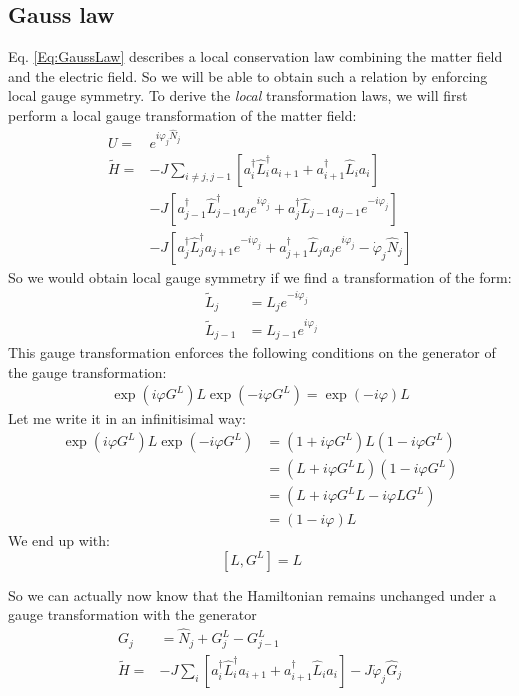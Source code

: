 \documentclass[10pt]{article}
\begin{document}
\subsection{Gauss law}\label{Sec:GaussLaw}
 Eq. \eqref{Eq:GaussLaw} describes a local conservation law combining the matter field and the electric field. So we will be able to obtain such a relation by enforcing local gauge symmetry. To derive the \textit{local} transformation laws, we will first perform a local gauge transformation of the matter field:
 \begin{eqnarray}
U =& e^{i\varphi_j \hat{N}_j}\\
\tilde{H} =&-J\sum_{i\neq j, j-1}\left[a_i^\dag \hat{L}^\dag_i a_{i+1} +a_{i+1}^\dag \hat{L}_i a_i\right]\\
  &- J \left[a_{j-1}^\dag \hat{L}^\dag_{j-1} a_{j} e^{i\varphi_j} +a_{j}^\dag \hat{L}_{j-1}a_{j-1} e^{-i \varphi_j}\right]  \nonumber\\
  &- J \left[a_{j}^\dag \hat{L}^\dag_{j} a_{j+1} e^{-i\varphi_j} +a_{j+1}^\dag \hat{L}_{j}a_{j} e^{i \varphi_j} - \dot{\varphi}_{j}\hat{N}_j\right]  \nonumber
\end{eqnarray}
 So we would obtain local gauge symmetry if we find a transformation of the form:
 \begin{eqnarray}
 ~\tilde{L}_j &= L_j e^{-i\varphi_j}\\
 ~\tilde{L}_{j-1} &= L_{j-1} e^{i\varphi_j}
 \end{eqnarray}
 This gauge transformation enforces the following conditions on the generator of the gauge transformation:
 \begin{align}
\exp(i\varphi G^L)L \exp(-i\varphi G^L) = \exp(-i\varphi)L
\end{align}
Let me write it in an infinitisimal way:
\begin{eqnarray}
\exp(i\varphi G^L)L \exp(-i\varphi G^L)  &= (1+i\varphi G^L)L (1-i\varphi G^L) \nonumber\\
&= (L+i\varphi G^L L) (1-i\varphi G^L)\nonumber\\
&= (L+i\varphi G^L L - i\varphi L G^L)\nonumber\\
&= (1-i\varphi )L\nonumber
\end{eqnarray}
We end up with:
\begin{equation}\label{Eq:CommLinkOps}
~[L,G^L] = L
\end{equation}

 So we can actually now know that the Hamiltonian remains unchanged under a gauge transformation with the generator  
  \begin{eqnarray}
G_j &= \hat{N}_j + G^L_j - G^L_{j-1}\\
 \tilde{H} =& -J\sum_{i}\left[a_i^\dag \hat{L}^\dag_i a_{i+1} +a_{i+1}^\dag \hat{L}_i a_i\right]- J \dot{\varphi}_{j}\hat{G}_j 
\end{eqnarray}
\end{document}

